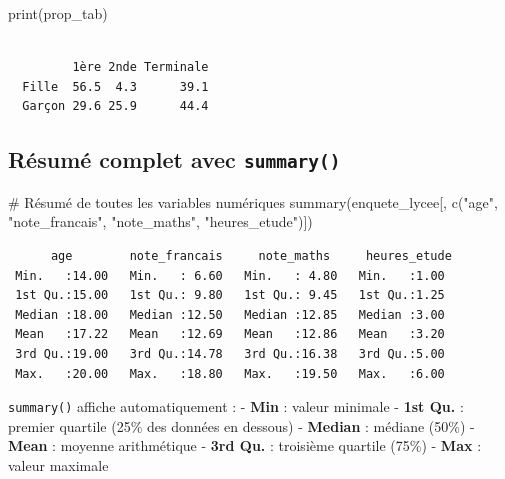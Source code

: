 \documentclass[
  french,
  11pt,
  a4paper,
]{article}
\newenvironment{Shaded}{}{}
\newcommand{\CommentTok}[1]{\textcolor[rgb]{0.42,0.45,0.49}{#1}}
\newcommand{\FunctionTok}[1]{\textcolor[rgb]{0.44,0.26,0.76}{#1}}
\newcommand{\NormalTok}[1]{\textcolor[rgb]{0.14,0.16,0.18}{#1}}
\newcommand{\StringTok}[1]{\textcolor[rgb]{0.01,0.18,0.38}{#1}}
\begin{document}
\begin{Shaded}
\begin{Highlighting}[]
\FunctionTok{print}\NormalTok{(prop\_tab)}
\end{Highlighting}
\end{Shaded}

\begin{verbatim}
        
         1ère 2nde Terminale
  Fille  56.5  4.3      39.1
  Garçon 29.6 25.9      44.4
\end{verbatim}

\subsection{\texorpdfstring{Résumé complet avec
\texttt{summary()}}{Résumé complet avec summary()}}\label{ruxe9sumuxe9-complet-avec-summary}

\begin{Shaded}
\begin{Highlighting}[]
\CommentTok{\# Résumé de toutes les variables numériques}
\FunctionTok{summary}\NormalTok{(enquete\_lycee[, }\FunctionTok{c}\NormalTok{(}\StringTok{"age"}\NormalTok{, }\StringTok{"note\_francais"}\NormalTok{, }\StringTok{"note\_maths"}\NormalTok{, }\StringTok{"heures\_etude"}\NormalTok{)])}
\end{Highlighting}
\end{Shaded}

\begin{verbatim}
      age        note_francais     note_maths     heures_etude 
 Min.   :14.00   Min.   : 6.60   Min.   : 4.80   Min.   :1.00  
 1st Qu.:15.00   1st Qu.: 9.80   1st Qu.: 9.45   1st Qu.:1.25  
 Median :18.00   Median :12.50   Median :12.85   Median :3.00  
 Mean   :17.22   Mean   :12.69   Mean   :12.86   Mean   :3.20  
 3rd Qu.:19.00   3rd Qu.:14.78   3rd Qu.:16.38   3rd Qu.:5.00  
 Max.   :20.00   Max.   :18.80   Max.   :19.50   Max.   :6.00  
\end{verbatim}

\begin{tcolorbox}[enhanced jigsaw, arc=.35mm, bottomrule=.15mm, bottomtitle=1mm, breakable, colback=white, colbacktitle=quarto-callout-tip-color!10!white, colframe=quarto-callout-tip-color-frame, coltitle=black, left=2mm, leftrule=.75mm, opacityback=0, opacitybacktitle=0.6, rightrule=.15mm, title=\textcolor{quarto-callout-tip-color}{\faLightbulb}\hspace{0.5em}{Les 5 indicateurs clés du résumé statistique}, titlerule=0mm, toprule=.15mm, toptitle=1mm]

\texttt{summary()} affiche automatiquement : - \textbf{Min} : valeur
minimale - \textbf{1st Qu.} : premier quartile (25\% des données en
dessous) - \textbf{Median} : médiane (50\%) - \textbf{Mean} : moyenne
arithmétique - \textbf{3rd Qu.} : troisième quartile (75\%) -
\textbf{Max} : valeur maximale

\end{tcolorbox}
\end{document}
